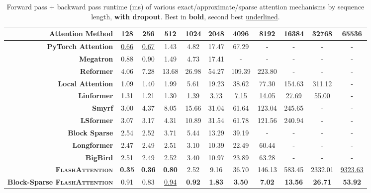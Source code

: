 \documentclass{article}
\newcommand{\sysname}{\textsc{FlashAttention}\xspace}
\begin{document}
\begin{table}
\centering
\scriptsize
\captionsetup{font=small}
\caption{Forward pass + backward pass runtime (ms) of various exact/approximate/sparse attention mechanisms by sequence length, \textbf{with dropout}. Best in \textbf{bold}, second best \underline{underlined}.}
\begin{tabular}{@{}r|cccccccccc@{}}
\toprule
\textbf{Attention Method} & 128 & 256 & 512 & 1024 & 2048 & 4096 & 8192 & 16384 & 32768 & 65536 \\
\hline
\textbf{PyTorch Attention} & \underline{0.66} & \underline{0.67} & 1.43 & 4.82 & 17.47 & 67.29 & - & - & - & - \\
\textbf{Megatron} & 0.88 & 0.90 & 1.49 & 4.73 & 17.41 & - & - & - & - & - \\
\hline
\textbf{Reformer} & 4.06 & 7.28 & 13.68 & 26.98 & 54.27 & 109.39 & 223.80 & - & - & - \\
\textbf{Local Attention} & 1.09 & 1.40 & 1.99 & 5.61 & 19.23 & 38.62 & 77.30 & 154.63 & 311.12 & - \\
\textbf{Linformer} & 1.31 & 1.21 & 1.30 & \underline{1.39} & \underline{3.73} & \underline{7.15} & \underline{14.05} & \underline{27.69} & \underline{55.00} & - \\
\textbf{Smyrf} & 3.00 & 4.37 & 8.05 & 15.66 & 31.04 & 61.64 & 123.04 & 245.65 & - & - \\
\textbf{LSformer} & 3.07 & 3.17 & 4.31 & 10.89 & 31.54 & 61.78 & 121.56 & 240.94 & - & - \\
\hline
\textbf{Block Sparse} & 2.54 & 2.52 & 3.71 & 5.44 & 13.29 & 39.19 & - & - & - & - \\
\textbf{Longformer} & 2.47 & 2.49 & 2.51 & 3.10 & 10.39 & 22.49 & 60.44 & - & - & - \\
\textbf{BigBird} & 2.51 & 2.49 & 2.52 & 3.40 & 10.97 & 23.89 & 63.28 & - & - & - \\
\hline
\textbf{\sysname} & \textbf{0.35} & \textbf{0.36} & \textbf{0.80} & 2.52 & 9.16 & 36.70 & 146.13 & 583.45 & 2332.01 & \underline{9323.63} \\
\textbf{Block-Sparse \sysname} & 0.91 & 0.83 & \underline{0.94} & \textbf{0.92} & \textbf{1.83} & \textbf{3.50} & \textbf{7.02} & \textbf{13.56} & \textbf{26.71} & \textbf{53.92} \\
\bottomrule
\end{tabular}
\label{tab:dropout_combined}
\end{table}
\end{document}
